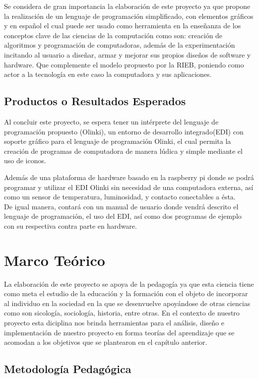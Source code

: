\documentclass[letterpaper,10pt]{article}
\begin{document}
Se considera de gran importancia la elaboración de este proyecto ya que propone la realización
de un lenguaje de programación simplificado, con elementos gráficos y en español el cual
puede ser usado como herramienta en la enseñanza de los conceptos clave de las ciencias de la 
computación como son: creación de algoritmos y programación de computadoras, además de la 
experimentación incitando al usuario a diseñar, armar y mejorar sus propios diseños de software
y hardware. Que complemente el modelo propuesto por la RIEB, poniendo como actor a la tecnología
en este caso la computadora y sus aplicaciones.



\subsection{Productos o Resultados Esperados}

Al concluir este proyecto, se espera tener un intérprete del lenguaje de programación
propuesto (Olinki), un entorno de desarrollo integrado(EDI)
con soporte gráfico para el lenguaje de programación Olinki, el cual permita la creación
de programas de computadora de manera lúdica y simple mediante el uso de iconos.

Además de una plataforma de hardware basado en la raspberry pi donde se podrá programar y utilizar el EDI Olinki 
sin necesidad de una computadora externa, así como un sensor de temperatura, luminosidad, y contacto
 conectables a ésta.\\
 De igual manera, contará con un manual de usuario donde vendrá descrito el lenguaje de programación,
 el uso del EDI, así como dos programas de ejemplo con su respectiva contra parte en hardware.
 

\section{Marco Teórico}
La elaboración de este proyecto se apoya de la pedagogía ya que esta
ciencia tiene como meta el estudio de la educación y la formación con el objeto
de incorporar al individuo en la sociedad en la que se desenvuelve apoyándose
de otras ciencias como son sicología,  sociología, historia, entre otras. En el
contexto de nuestro proyecto esta diciplina nos brinda herramientas para el
análisis, diseño e implementación de nuestro proyecto en forma teorías del
aprendizaje que se acomodan a los objetivos que se plantearon en el capítulo
anterior.

\subsection{Metodología Pedagógica}
\end{document}
